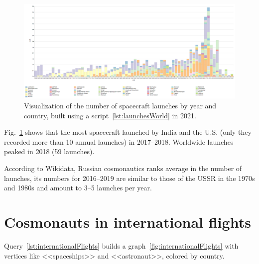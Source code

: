 \begin{figure}[h!]
  \includegraphics[width=\linewidth]{graphics/chapter/spacecraft/Visualization of the number of spacecraft launches by year and country 2021.png}
  \caption[The schedule of spacecraft launches worldwide by year and country]{Visualization of the number of spacecraft launches by year and country, built using a script~\protect\ref{lst:launchesWorld} in 2021.}
  \label{fig:launchesWorld}%
\end{figure}

Fig.~\ref{fig:launchesWorld} shows that the most spacecraft 
launched by India and the U.S. 
(only they recorded more than 10 annual launches) in 2017--2018. 
Worldwide launches peaked in 2018 (59 launches). 

According to Wikidata, Russian cosmonautics ranks average in the number of launches, 
its numbers for 2016--2019 are similar to those of the USSR in the 1970s and 1980s 
and amount to 3--5 launches per year.

\label{question:spacecraft_2}

\section{Cosmonauts in international flights}

Query~\ref{lst:internationalFlights} builds a graph~\ref{fig:internationalFlights} with vertices like <<spaceships>> and <<astronaut>>, colored by country.

